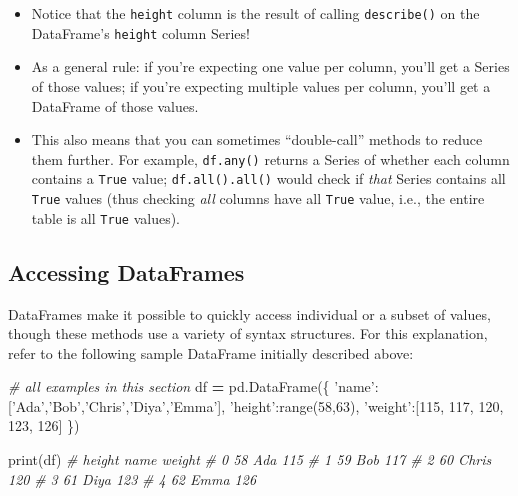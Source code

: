 \documentclass[]{book}
\newenvironment{Shaded}{\begin{snugshade}}{\end{snugshade}}
\newcommand{\DecValTok}[1]{\textcolor[rgb]{0.00,0.00,0.81}{#1}}
\newcommand{\StringTok}[1]{\textcolor[rgb]{0.31,0.60,0.02}{#1}}
\newcommand{\CommentTok}[1]{\textcolor[rgb]{0.56,0.35,0.01}{\textit{#1}}}
\newcommand{\OperatorTok}[1]{\textcolor[rgb]{0.81,0.36,0.00}{\textbf{#1}}}
\newcommand{\BuiltInTok}[1]{#1}
\newcommand{\NormalTok}[1]{#1}
\begin{document}
\begin{itemize}
\item
  Notice that the \texttt{height} column is the result of calling
  \texttt{describe()} on the DataFrame's \texttt{height} column Series!
\item
  As a general rule: if you're expecting one value per column, you'll
  get a Series of those values; if you're expecting multiple values per
  column, you'll get a DataFrame of those values.
\item
  This also means that you can sometimes ``double-call'' methods to
  reduce them further. For example, \texttt{df.any()} returns a Series
  of whether each column contains a \texttt{True} value;
  \texttt{df.all().all()} would check if \emph{that} Series contains all
  \texttt{True} values (thus checking \emph{all} columns have all
  \texttt{True} value, i.e., the entire table is all \texttt{True}
  values).
\end{itemize}

\hypertarget{accessing-dataframes}{\subsection{Accessing
DataFrames}\label{accessing-dataframes}}

DataFrames make it possible to quickly access individual or a subset of
values, though these methods use a variety of syntax structures. For
this explanation, refer to the following sample DataFrame initially
described above:

\begin{Shaded}
\begin{Highlighting}[]
\CommentTok{# all examples in this section}
\NormalTok{df }\OperatorTok{=}\NormalTok{ pd.DataFrame(\{}
    \StringTok{'name'}\NormalTok{:[}\StringTok{'Ada'}\NormalTok{,}\StringTok{'Bob'}\NormalTok{,}\StringTok{'Chris'}\NormalTok{,}\StringTok{'Diya'}\NormalTok{,}\StringTok{'Emma'}\NormalTok{],}
    \StringTok{'height'}\NormalTok{:}\BuiltInTok{range}\NormalTok{(}\DecValTok{58}\NormalTok{,}\DecValTok{63}\NormalTok{),}
    \StringTok{'weight'}\NormalTok{:[}\DecValTok{115}\NormalTok{, }\DecValTok{117}\NormalTok{, }\DecValTok{120}\NormalTok{, }\DecValTok{123}\NormalTok{, }\DecValTok{126}\NormalTok{]}
\NormalTok{\})}

\BuiltInTok{print}\NormalTok{(df)}
    \CommentTok{#     height   name   weight}
    \CommentTok{# 0      58    Ada      115}
    \CommentTok{# 1      59    Bob      117}
    \CommentTok{# 2      60  Chris      120}
    \CommentTok{# 3      61   Diya      123}
    \CommentTok{# 4      62   Emma      126}
\end{Highlighting}
\end{Shaded}
\end{document}
